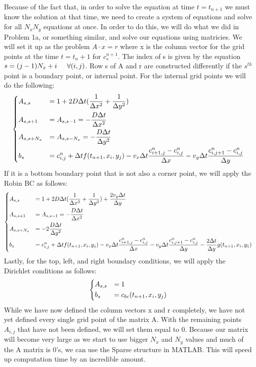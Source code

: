 \documentclass[12pt]{article}
\begin{document}
Because of the fact that, in order to solve the equation at time $t = t_{n+1}$ we must know the solution at that time, we need to create a system of equations and solve for all $N_xN_y$ equations at once. In order to do this, we will do what we did in Problem 1a, or something similar, and solve our equations using matricies. We will set it up as the problem $A\cdot x = r$ where x is the column vector for the grid points at the time $t = t_n+1$ for $c_{s}^{n+1}$. The index of s is given by the equation $s = (j-1)N_x + i\hspace{.5cm} \forall (i,j)$. Row s of A and r are constructed differently if the $s^{th}$ point is a boundary point, or internal point. For the internal grid points we will do the following:
\begin{equation}
\begin{dcases}
A_{s,s} &= 1 + 2D\Delta t(\frac{1}{\Delta x^2} + \frac{1}{\Delta y^2})\\
A_{s,s+1} &= A_{s,s-1} = -\frac{D\Delta t}{\Delta x^2}\\
A_{s,s+N_x} &= A_{s,s-N_x} = -\frac{D \Delta t}{\Delta y^2}\\
b_s &= c^n_{i,j} + \Delta t f(t_{n+1},x_i,y_j) - v_x\Delta t \frac{c^n_{i+1,j} - c^n_{i,j}}{\Delta x} - v_y\Delta t \frac{c^n_{i,j+1} - c^n_{i,j}}{\Delta y}
\end{dcases}
\end{equation}
If it is a bottom boundary point that is not also a corner point, we will apply the Robin BC as follows:
\begin{equation}
\begin{dcases}
	A_{s,s} &= 1 + 2D\Delta t(\frac{1}{\Delta x^2} + \frac{1}{\Delta y^2}) + \frac{2v_y\Delta t}{\Delta y}\\
	A_{s,s+1} &= A_{s,s-1} = -\frac{D\Delta t}{\Delta x^2}\\
	A_{s,s+N_x} &= -2\frac{D \Delta t}{\Delta y^2}\\
b_s &= c^n_{i,j} + \Delta t f(t_{n+1},x_i,y_j) - v_x\Delta t \frac{c^n_{i+1,j} - c^n_{i,j}}{\Delta x} - v_y\Delta t \frac{c^n_{i,j+1} - c^n_{i,j}}{\Delta y} -\frac{2\Delta t}{\Delta y}g(t_{n+1},x_i,y_1)
\end{dcases}
\end{equation}
Lastly, for the top, left, and right boundary conditions, we will apply the Dirichlet conditions as follows:
\begin{equation}
\begin{dcases}
	A_{s,s} &= 1\\
	b_s &= c_{bc}(t_{n+1},x_i,y_j)
\end{dcases}
\end{equation}
While we have now defined the column vectors x and r completely, we have not yet defined every single grid point of the matrix A. With the remaining points $A_{i,j}$ that have not been defined, we will set them equal to 0. Because our matrix will become very large as we start to use bigger $N_x$ and $N_y$ values and much of the A matrix is 0's, we can use the Sparse structure in MATLAB. This will speed up computation time by an incredible amount.
\end{document}
